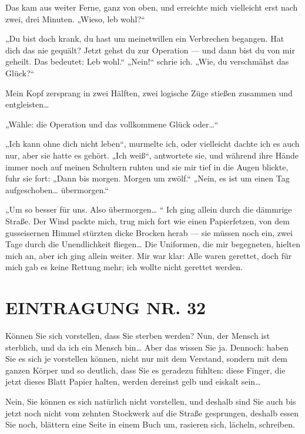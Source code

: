 Das kam aus weiter Ferne, ganz von oben, und erreichte mich
vielleicht erst nach zwei, drei Minuten. „Wieso, leb wohl?“

„Du bist doch krank, du hast um meinetwillen ein Verbrechen
begangen. Hat dich das nie gequält? Jetzt gehst du zur Operation —
und dann bist du von mir geheilt. Das bedeutet: Leb wohl.“ „Nein!“
schrie ich. „Wie, du verschmähst das Glück?“

Mein Kopf zersprang in zwei Hälften, zwei logische Züge stießen
zusammen und entgleisten\ldots{}

„Wähle: die Operation und das vollkommene Glück oder\ldots{}“

„Ich kann ohne dich nicht leben“, murmelte ich, oder vielleicht
dachte ich es auch nur, aber sie hatte es gehört. „Ich weiß“,
antwortete sie, und während ihre Hände immer noch auf meinen
Schultern ruhten und sie mir tief in die Augen blickte, fuhr sie
fort: „Dann bis morgen. Morgen um zwölf.“ „Nein, es ist um einen
Tag aufgeschoben\ldots{} übermorgen.“

„Um so besser für uns. Also übermorgen\ldots{} “ Ich ging allein durch
die dämmrige Straße. Der Wind packte mich, trug mich fort wie einen
Papierfetzen, von dem gusseisernen Himmel stürzten dicke Brocken
herab — sie müssen noch ein, zwei Tage durch die Unendlichkeit
fliegen\ldots{} Die Uniformen, die mir begegneten, hielten mich an, aber
ich ging allein weiter. Mir war klar: Alle waren gerettet, doch für
mich gab es keine Rettung mehr; ich wollte nicht gerettet werden.

\section{EINTRAGUNG NR. 32}

Können Sie sich vorstellen, dass Sie sterben werden? Nun, der
Mensch ist sterblich, und da ich ein Mensch bin\ldots{} Aber das wissen
Sie ja. Dennoch: haben Sie es sich je vorstellen können, nicht nur
mit dem Verstand, sondern mit dem ganzen Körper und so deutlich,
dass Sie es geradezu fühlten: diese Finger, die jetzt dieses Blatt
Papier halten, werden dereinst gelb und eiskalt sein\ldots{}

Nein, Sie können es sich natürlich nicht vorstellen, und deshalb
sind Sie auch bis jetzt noch nicht vom zehnten Stockwerk auf die
Straße gesprungen, deshalb essen Sie noch, blättern eine Seite in
einem Buch um, rasieren sich, lächeln, schreiben.

